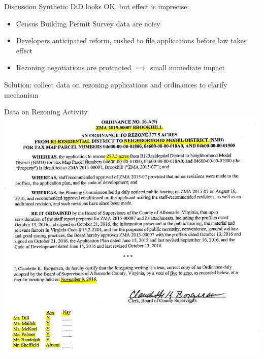 \documentclass[10pt]{beamer}
\begin{document}
\begin{frame}{Discussion}
Synthetic DiD looks OK, but effect is imprecise: 
\begin{itemize}
    \item Census Building Permit Survey data are noisy
    \item Developers anticipated reform, rushed to file applications before law takes effect
    \item Rezoning negotiations are protracted $\implies$ small immediate impact
\end{itemize}
\vspace{2em}
Solution: collect data on rezoning applications and ordinances to clarify mechanism
\end{frame}

\begin{frame}{Data on Rezoning Activity}
    \includegraphics[width=\textwidth]{figures/images/rezoning_example1.png}
\end{frame}
\end{document}
